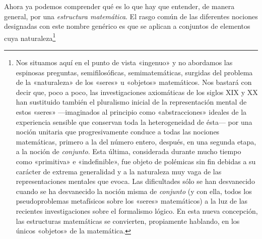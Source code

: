 \documentclass[a4paper, 12pt, draft]{article}
\begin{document}
Ahora ya podemos comprender qué es lo que hay que entender, de manera general, por una \textit{estructura matemática}. El rasgo común de las diferentes nociones designadas con este nombre genérico es que se aplican a conjuntos de elementos cuya naturaleza\footnote{Nos situamos aquí en el punto de vista «ingenuo» y no abordamos las espinosas preguntas, semifilosóficas, semimatemáticas, surgidas del problema de la «naturaleza» de los «seres» u «objetos» matemáticos. Nos bastará con decir que, poco a poco, las investigaciones axiomáticas de los siglos XIX y XX han sustituido también el pluralismo inicial de la representación mental de estos «seres» ---imaginados al principio como «abstracciones» ideales de la experiencia sensible que conservan toda la heterogeneidad de ésta--- por una noción unitaria que progresivamente conduce a todas las nociones matemáticas, primero a la del número entero, después, en una segunda etapa, a la noción de \textit{conjunto}. Esta última, considerada durante mucho tiempo como «primitiva» e «indefinible», fue objeto de polémicas sin fin debidas a su carácter de extrema generalidad y a la naturaleza muy vaga de las representaciones mentales que evoca. Las dificultades sólo se han desvanecido cuando se ha desvanecido la noción misma de \textit{conjunto} (y con ella, todos los pseudoproblemas metafísicos sobre los «seres» matemáticos) a la luz de las recientes investigaciones sobre el formalismo lógico. En esta nueva concepción, las estructuras matemáticas se convierten, propiamente hablando, en los únicos «objetos» de la matemática.

}
\end{document}
